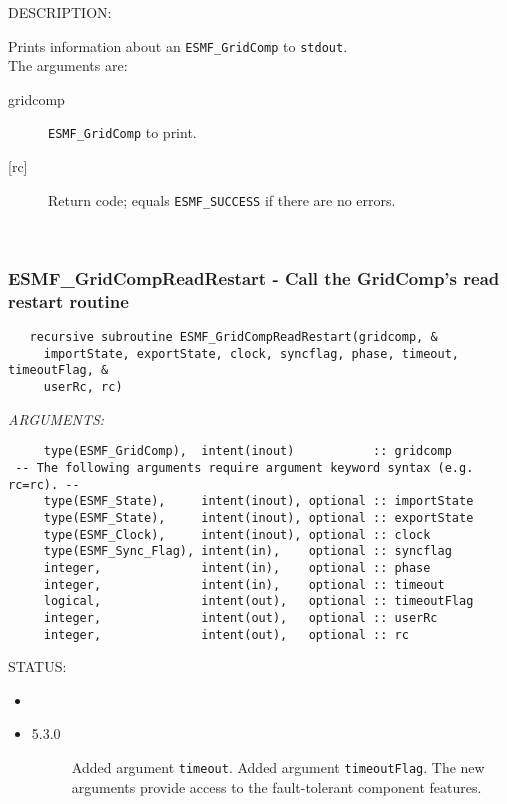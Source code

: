 {\sf DESCRIPTION:\\ }


   Prints information about an {\tt ESMF\_GridComp} to {\tt stdout}. \\
  
   The arguments are:
   \begin{description}
   \item[gridcomp]
     {\tt ESMF\_GridComp} to print.
   \item[{[rc]}]
     Return code; equals {\tt ESMF\_SUCCESS} if there are no errors.
   \end{description}
   
 
\mbox{}\hrulefill\ 
 
\subsubsection [ESMF\_GridCompReadRestart] {ESMF\_GridCompReadRestart - Call the GridComp's read restart routine}


  
\begin{verbatim}   recursive subroutine ESMF_GridCompReadRestart(gridcomp, &
     importState, exportState, clock, syncflag, phase, timeout, timeoutFlag, &
     userRc, rc)\end{verbatim}{\em ARGUMENTS:}
\begin{verbatim}     type(ESMF_GridComp),  intent(inout)           :: gridcomp
 -- The following arguments require argument keyword syntax (e.g. rc=rc). --
     type(ESMF_State),     intent(inout), optional :: importState
     type(ESMF_State),     intent(inout), optional :: exportState
     type(ESMF_Clock),     intent(inout), optional :: clock
     type(ESMF_Sync_Flag), intent(in),    optional :: syncflag
     integer,              intent(in),    optional :: phase
     integer,              intent(in),    optional :: timeout
     logical,              intent(out),   optional :: timeoutFlag
     integer,              intent(out),   optional :: userRc
     integer,              intent(out),   optional :: rc\end{verbatim}
{\sf STATUS:}
   \begin{itemize}
   \item{}
   \item{}
   \begin{description}
   \item[5.3.0] Added argument {\tt timeout}.
                Added argument {\tt timeoutFlag}.
                The new arguments provide access to the fault-tolerant component
                features.
   \end{description}
   \end{itemize}
  
